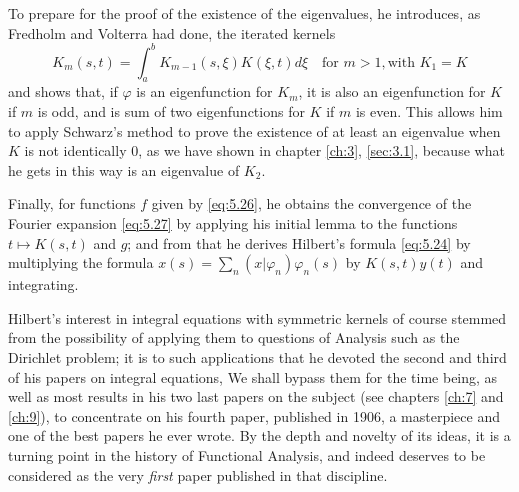\documentclass[12pt,a4paper,leqno,twoside]{extbook}
\begin{document}
To prepare for the proof of the existence of the eigenvalues, he introduces, as Fredholm and Volterra had done, the iterated kernels
\begin{equation}
    \label{eq:5.31}
    K_m(s,t) = \int_a^b K_{m-1}(s, \xi)K(\xi, t)d\xi \quad \text{for } m > 1, \text{with } K_1 = K
\end{equation}
and shows that, if \(\varphi\) is an eigenfunction for \(K_m\), it is also an eigenfunction for \(K\) if \(m\) is odd, and is sum of two eigenfunctions for \(K\) if \(m\) is even. This allows him to apply Schwarz's method to prove the existence of at least an eigenvalue when \(K\) is not identically 0, as we have shown in chapter \ref{ch:3}, \ref{sec:3.1}, because what he gets in this way is an eigenvalue of \(K_2\).

Finally, for functions \(f\) given by \eqref{eq:5.26}, he obtains the convergence of the Fourier expansion \eqref{eq:5.27} by applying his initial lemma to the functions \(t \mapsto K(s,t)\) and \(g\); and from that he derives Hilbert's formula \eqref{eq:5.24} by multiplying the formula \(x(s) = \sum_n (x|\varphi_n)\varphi_n(s)\) by \(K(s,t)y(t)\) and integrating.

Hilbert's interest in integral equations with symmetric kernels of course stemmed from the possibility of applying them to questions of Analysis such as the Dirichlet problem; it is to such applications that he devoted the second and third of his papers on integral equations, We shall bypass them for the time being, as well as most results in his two last papers on the subject (see chapters \ref{ch:7} and \ref{ch:9}), to concentrate on his fourth paper, published in 1906, a masterpiece and one of the best papers he ever wrote. By the depth and novelty of its ideas, it is a turning point in the history of Functional Analysis, and indeed deserves to be considered as the very \emph{first} paper published in that discipline.
\end{document}
